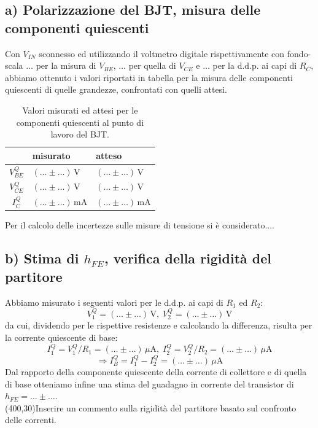 \documentclass[10pt,a4paper]{article}
\begin{document}
\subsection*{a) Polarizzazione del BJT, misura delle componenti quiescenti}
Con $V_{IN}$ sconnesso ed utilizzando il voltmetro digitale rispettivamente con fondo-scala $\ldots$ per la misura di $V_{BE}$, $\ldots$ per quella di $V_{CE}$ e $\ldots$ per la d.d.p. ai capi di $R_C$, abbiamo ottenuto i valori riportati in tabella per la misura delle componenti quiescenti di quelle grandezze, confrontati con quelli attesi.
\begin{table}[h]
\centering
\begin{tabular}{|c|l|l|}
\hline
\hline 
& misurato & atteso\\
\hline
$V_{BE}^Q$ & $ (\dots \pm \ldots) \,\mathrm{V}$  & $ (\dots \pm \ldots) \,\mathrm{V}$  \\
\hline 
$V_{CE}^Q$ & $ (\dots \pm \ldots) \,\mathrm{V}$  & $ (\dots \pm \ldots) \,\mathrm{V}$  \\
\hline
$I_C^Q$ & $ (\dots \pm \ldots) \,\mathrm{mA}$  & $ (\dots \pm \ldots) \,\mathrm{mA}$  \\
\hline 
\hline
\end{tabular} 
\caption{Valori misurati ed attesi per le componenti quiescenti al punto di lavoro del BJT.}
\label{tab:quiescente}
\end{table}
Per il calcolo delle incertezze sulle misure di tensione si \`e considerato....
%
\subsection*{b) Stima di $h_{FE}$, verifica della rigidit\`a del partitore}
Abbiamo misurato i seguenti valori per le d.d.p. ai capi di $R_1$ ed $R_2$:
\[
V_1^Q = (\dots \pm \ldots) \,\mathrm{V}, \;V_2^Q = (\dots \pm \ldots) \,\mathrm{V}
\]
da cui, dividendo per le rispettive resistenze e calcolando la differenza, risulta per la corrente quiescente di base:
\[ 
I_1^Q = V_1^Q/R_1 = (\dots \pm \ldots) \,\mu\mathrm{A},\;I_2^Q = V_2^Q/R_2 = (\dots \pm \ldots) \,\mu\mathrm{A}
\]
\[
\Rightarrow I_B^Q =  I_1^Q - I_2^Q = (\dots \pm \ldots) \,\mu\mathrm{A}
\]
Dal rapporto della componente quiescente della corrente di collettore e di quella di base otteniamo infine una stima del 
guadagno in corrente del transistor di $h_{FE} = \ldots \pm \ldots$.\\
\vspace{0.5cm}
\framebox(400,30){Inserire un commento sulla rigidit\`a del partitore basato sul confronto delle correnti.}
\end{document}

